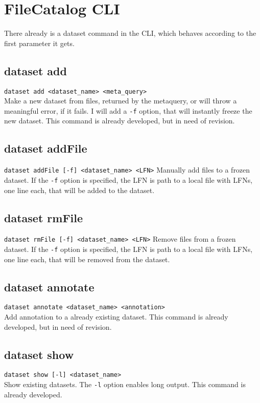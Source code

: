 \documentclass{scrreprt}
\begin{document}
\section{FileCatalog CLI}
There already is a dataset command in the CLI, which behaves according to the first parameter it gets. 

\subsection{dataset add}
\texttt{dataset add <dataset_name> <meta_query>} \\
Make a new dataset from files, returned by the metaquery, or will throw a meaningful error, if it fails.  I will add a \texttt{-f} option, that will instantly freeze the new dataset. This command is already developed, but in need of revision.

\subsection{dataset addFile}
\texttt{dataset addFile [-f] <dataset_name> <LFN>}
Manually add files to a frozen dataset. If the \texttt{-f} option is specified, the LFN is path to a local file with LFNs, one line each, that will be added to the dataset.

\subsection{dataset rmFile}
\texttt{dataset rmFile [-f] <dataset_name> <LFN>}
Remove files from a frozen dataset. If the \texttt{-f} option is specified, the LFN is path to a local file with LFNs, one line each, that will be removed from the dataset.

\subsection{dataset annotate} 
\texttt{dataset annotate <dataset_name> <annotation>}  \\
Add annotation to a already existing dataset. This command is already developed, but in need of revision.

\subsection{dataset show}
\texttt{dataset show [-l] <dataset_name>} \\
Show existing datasets. The \texttt{-l} option enables long output. This command is already developed.
               
\end{document}
